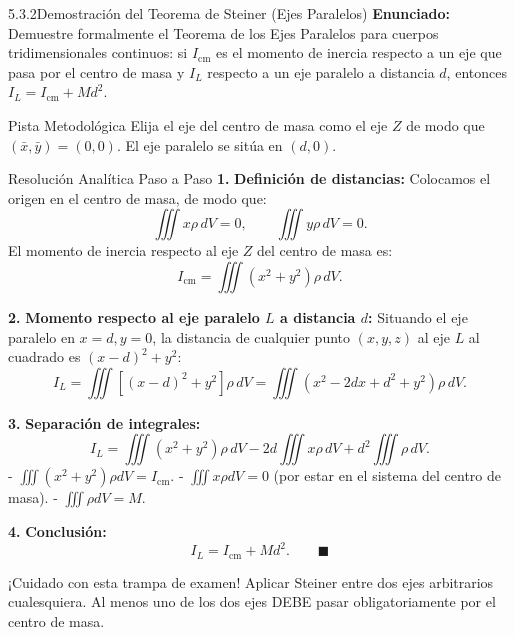 \documentclass[11pt,a4paper]{article}
\begin{document}
\begin{nivelbox}{5.3.2}{Demostración del Teorema de Steiner (Ejes Paralelos)}
\textbf{Enunciado:}\\
Demuestre formalmente el Teorema de los Ejes Paralelos para cuerpos tridimensionales continuos: si $I_{\text{cm}}$ es el momento de inercia respecto a un eje que pasa por el centro de masa y $I_L$ respecto a un eje paralelo a distancia $d$, entonces $I_L = I_{\text{cm}} + M d^2$.

\begin{observacionbox}{Pista Metodológica}
Elija el eje del centro de masa como el eje $Z$ de modo que $(\bar{x}, \bar{y}) = (0,0)$. El eje paralelo se sitúa en $(d, 0)$.
\end{observacionbox}

\begin{ejerciciobox}{Resolución Analítica Paso a Paso}
\smallskip\noindent\textbf{1.} \textbf{Definición de distancias:}
Colocamos el origen en el centro de masa, de modo que:
\[\iiint x \rho \, dV = 0, \qquad \iiint y \rho \, dV = 0.\]
El momento de inercia respecto al eje $Z$ del centro de masa es:
\[I_{\text{cm}} = \iiint (x^2 + y^2) \rho \, dV.\]

\smallskip\noindent\textbf{2.} \textbf{Momento respecto al eje paralelo $L$ a distancia $d$:}
Situando el eje paralelo en $x = d, y = 0$, la distancia de cualquier punto $(x,y,z)$ al eje $L$ al cuadrado es $(x - d)^2 + y^2$:
\[I_L = \iiint \left[ (x - d)^2 + y^2 \right] \rho \, dV = \iiint (x^2 - 2dx + d^2 + y^2) \rho \, dV.\]

\smallskip\noindent\textbf{3.} \textbf{Separación de integrales:}
\[I_L = \iiint (x^2 + y^2) \rho \, dV - 2d \iiint x \rho \, dV + d^2 \iiint \rho \, dV.\]
- $\iiint (x^2+y^2)\rho dV = I_{\text{cm}}$.
- $\iiint x \rho dV = 0$ (por estar en el sistema del centro de masa).
- $\iiint \rho dV = M$.

\smallskip\noindent\textbf{4.} \textbf{Conclusión:}
\[I_L = I_{\text{cm}} + M d^2. \qquad \blacksquare\]
\end{ejerciciobox}

\begin{errorbox}{¡Cuidado con esta trampa de examen!}
Aplicar Steiner entre dos ejes arbitrarios cualesquiera. Al menos uno de los dos ejes DEBE pasar obligatoriamente por el centro de masa.
\end{errorbox}
\end{nivelbox}
\bigskip
\end{document}
